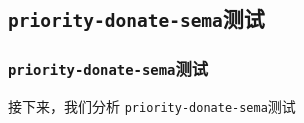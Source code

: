 \documentclass{beamer}
\begin{document}
\subsection{\texttt{priority-donate-sema}测试}

\begin{frame}
  \frametitle{\texttt{priority-donate-sema}测试}
  接下来，我们分析 \texttt{priority-donate-sema}测试














\end{frame}
\end{document}
